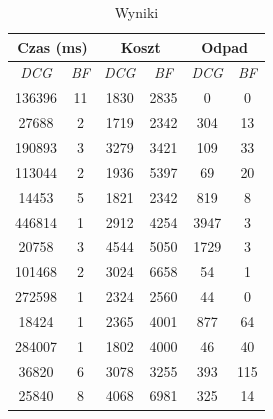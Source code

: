 \begin{table}[]
\centering
\caption{Wyniki}
\label{tab:result}
\begin{tabular}{@{}|c|c|c|c|c|c|@{}}
\toprule
\multicolumn{2}{|c|}{\textbf{Czas (ms)}} & \multicolumn{2}{c|}{\textbf{Koszt}} & \multicolumn{2}{c|}{\textbf{Odpad}} \\ \midrule
\textit{DCG}        & \textit{BF}        & \textit{DCG}      & \textit{BF}     & \textit{DCG}      & \textit{BF}     \\ \midrule
136396              & 11                 & 1830              & 2835            & 0                 & 0               \\ \midrule
27688               & 2                  & 1719              & 2342            & 304               & 13              \\ \midrule
190893              & 3                  & 3279              & 3421            & 109               & 33              \\ \midrule
113044              & 2                  & 1936              & 5397            & 69                & 20              \\ \midrule
14453               & 5                  & 1821              & 2342            & 819               & 8               \\ \midrule
446814              & 1                  & 2912              & 4254            & 3947              & 3               \\ \midrule
20758               & 3                  & 4544              & 5050            & 1729              & 3               \\ \midrule
101468              & 2                  & 3024              & 6658            & 54                & 1               \\ \midrule
272598              & 1                  & 2324              & 2560            & 44                & 0               \\ \midrule
18424               & 1                  & 2365              & 4001            & 877               & 64              \\ \midrule
284007              & 1                  & 1802              & 4000            & 46                & 40              \\ \midrule
36820               & 6                  & 3078              & 3255            & 393               & 115             \\ \midrule
25840               & 8                  & 4068              & 6981            & 325               & 14              \\ \midrule

\end{tabular}
\end{table}
